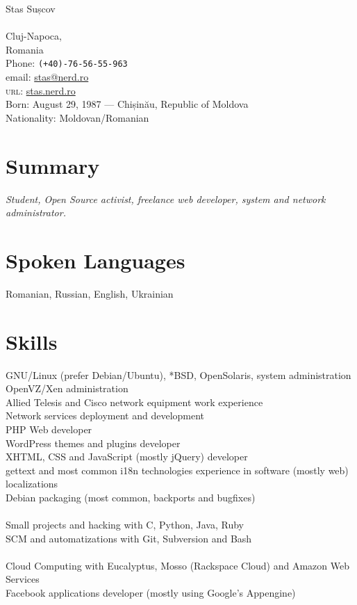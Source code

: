 \documentclass[10pt, a4paper]{article}
\begin{document}
{\LARGE Stas Sușcov}\\[1cm]
\\
 Cluj-Napoca,\\
Romania\\[.2cm]
Phone: \texttt{(+40)-76-56-55-963}\\[.2cm]
email: \href{mailto:stas@nerd.ro}{stas@nerd.ro}\\
\textsc{url}: \href{http://stas.nerd.ro/index.php/about/}{stas.nerd.ro}\\ 
\vfill
 Born:  August 29, 1987 --- Chișinău, Republic of Moldova\\
Nationality:  Moldovan/Romanian

\section*{Summary}
\emph{Student, Open Source activist, freelance web developer, system and network administrator.} 

\section*{Spoken Languages}
 Romanian, Russian, English, Ukrainian

\section*{Skills}
 GNU/Linux (prefer Debian/Ubuntu), *BSD, OpenSolaris, system administration\\
OpenVZ/Xen administration\\
Allied Telesis and Cisco network equipment work experience\\
Network services deployment and development\\
PHP Web developer\\
WordPress themes and plugins developer\\
XHTML, CSS and JavaScript (mostly jQuery) developer\\
gettext and most common i18n technologies experience in software (mostly web) localizations\\
Debian packaging (most common, backports and bugfixes)\\
\\
Small projects and hacking with C, Python, Java, Ruby\\
SCM and automatizations with Git, Subversion and Bash\\
\\
Cloud Computing with Eucalyptus, Mosso (Rackspace Cloud) and Amazon Web Services
\\
Facebook applications developer (mostly using Google's Appengine)
\end{document}
